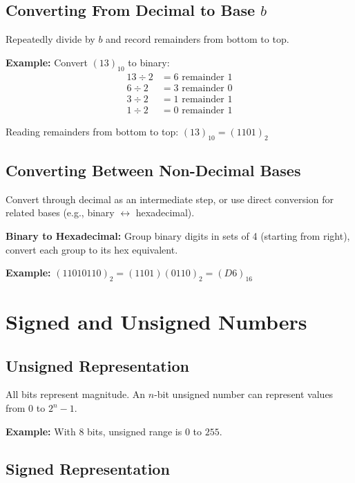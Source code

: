 \documentclass{report}
\begin{document}
\subsection{Converting From Decimal to Base $b$}

Repeatedly divide by $b$ and record remainders from bottom to top.

\textbf{Example:} Convert $(13)_{10}$ to binary:
\begin{align*}
    13 \div 2 &= 6 \text{ remainder } 1 \\
    6 \div 2 &= 3 \text{ remainder } 0 \\
    3 \div 2 &= 1 \text{ remainder } 1 \\
    1 \div 2 &= 0 \text{ remainder } 1
\end{align*}

Reading remainders from bottom to top: $(13)_{10} = (1101)_2$

\subsection{Converting Between Non-Decimal Bases}

Convert through decimal as an intermediate step, or use direct conversion for related bases (e.g., binary $\leftrightarrow$ hexadecimal).

\textbf{Binary to Hexadecimal:} Group binary digits in sets of 4 (starting from right), convert each group to its hex equivalent.

\textbf{Example:} $(11010110)_2 = (1101)(0110)_2 = (D6)_{16}$

\section{Signed and Unsigned Numbers}

\subsection{Unsigned Representation}

All bits represent magnitude. An $n$-bit unsigned number can represent values from $0$ to $2^n - 1$.

\textbf{Example:} With 8 bits, unsigned range is $0$ to $255$.

\subsection{Signed Representation}
\end{document}
